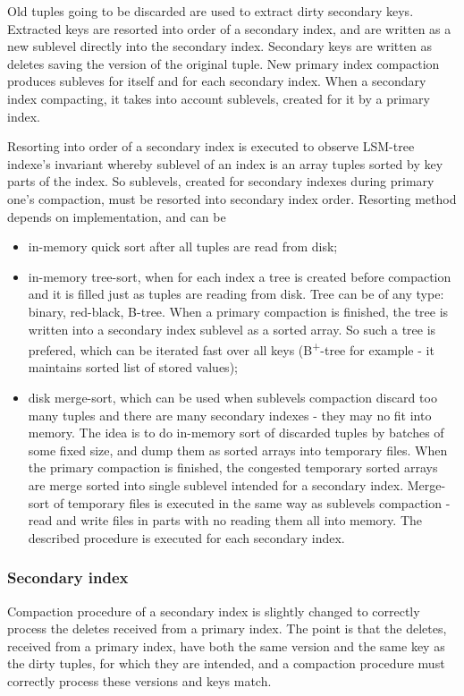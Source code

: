 \documentclass{vldb}
\begin{document}
Old tuples going to be discarded are used to extract dirty secondary keys.
Extracted keys are resorted into order of a secondary index, and are written as
a new sublevel directly into the secondary index. Secondary keys are written as
deletes saving the version of the original tuple. New primary index compaction
produces subleves for itself and for each secondary index. When a secondary
index compacting, it takes into account sublevels, created for it by a primary
index.

Resorting into order of a secondary index is executed to observe LSM-tree
indexe's invariant whereby sublevel of an index is an array tuples sorted by key
parts of the index. So sublevels, created for secondary indexes during primary
one's compaction, must be resorted into secondary index order. Resorting method
depends on implementation, and can be
\begin{itemize}
\item in-memory quick sort after all tuples are read from disk;
\item in-memory tree-sort, when for each index a tree is created before
compaction and it is filled just as tuples are reading from disk. Tree can be of
any type: binary, red-black, B-tree. When a primary compaction is finished, the
tree is written into a secondary index sublevel as a sorted array. So such a
tree is prefered, which can be iterated fast over all keys
(B\textsuperscript{+}-tree for example - it maintains sorted list of stored
values);
\item disk merge-sort, which can be used when sublevels compaction discard too
many tuples and there are many secondary indexes - they may no fit into memory.
The idea is to do in-memory sort of discarded tuples by batches of some fixed
size, and dump them as sorted arrays into temporary files. When the primary
compaction is finished, the congested temporary sorted arrays are merge sorted
into single sublevel intended for a secondary index. Merge-sort of temporary
files is executed in the same way as sublevels compaction - read and write files
in parts with no reading them all into memory. The described procedure is
executed for each secondary index.
\end{itemize}

\subsubsection{Secondary index}

Compaction procedure of a secondary index is slightly changed to correctly
process the deletes received from a primary index. The point is that the
deletes, received from a primary index, have both the same version and the same
key as the dirty tuples, for which they are intended, and a compaction procedure
must correctly process these versions and keys match.
\end{document}
